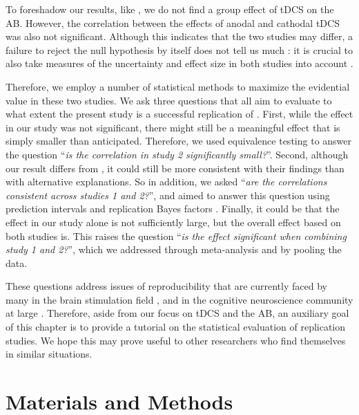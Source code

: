 \documentclass[11pt,english,]{memoir}
\begin{document}
To foreshadow our results, like \textcite{London2015}, we do not find a group effect of tDCS on the AB. However, the correlation between the effects of anodal and cathodal tDCS was also not significant. Although this indicates that the two studies may differ, a failure to reject the null hypothesis by itself does not tell us much \autocite{Harms2018}: it is crucial to also take measures of the uncertainty and effect size in both studies into account \autocite{Simonsohn2015}.

Therefore, we employ a number of statistical methods to maximize the evidential value in these two studies. We ask three questions that all aim to evaluate to what extent the present study is a successful replication \autocites{Zwaan2018}[cf.][]{Camerer2018}{OSC2015} of \textcite{London2015}. First, while the effect in our study was not significant, there might still be a meaningful effect that is simply smaller than anticipated. Therefore, we used equivalence testing \autocite{Lakens2018} to answer the question ``\emph{is the correlation in study 2 significantly small?}''. Second, although our result differs from \textcite{London2015}, it could still be more consistent with their findings than with alternative explanations. So in addition, we asked ``\emph{are the correlations consistent across studies 1 and 2?}'', and aimed to answer this question using prediction intervals \autocites{Spence2016}{Patil2016} and replication Bayes factors \autocites{Wagenmakers2016}{Verhagen2014}. Finally, it could be that the effect in our study alone is not sufficiently large, but the overall effect based on both studies is. This raises the question ``\emph{is the effect significant when combining study 1 and 2?}'', which we addressed through meta-analysis \autocites{Quintana2015}{Goh2016} and by pooling the data.

These questions address issues of reproducibility that are currently faced by many in the brain stimulation field \autocite{Heroux2017}, and in the cognitive neuroscience community at large \autocites{Munafo2017}{Huber2019}. Therefore, aside from our focus on tDCS and the AB, an auxiliary goal of this chapter is to provide a tutorial on the statistical evaluation of replication studies. We hope this may prove useful to other researchers who find themselves in similar situations.

\hypertarget{AB_tDCS-methods}{%
\section{Materials and Methods}\label{AB_tDCS-methods}}
\end{document}

